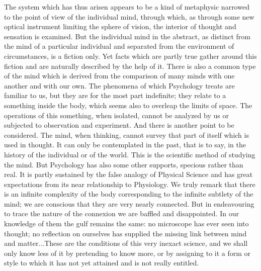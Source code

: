 The system which has thus arisen appears to be a kind of metaphysic
narrowed to the point of view of the individual mind, through which, as
through some new optical instrument limiting the sphere of vision, the
interior of thought and sensation is examined. But the individual mind
in the abstract, as distinct from the mind of a particular individual
and separated from the environment of circumstances, is a fiction only.
Yet facts which are partly true gather around this fiction and are
naturally described by the help of it. There is also a common type of
the mind which is derived from the comparison of many minds with one
another and with our own. The phenomena of which Psychology treats are
familiar to us, but they are for the most part indefinite; they relate
to a something inside the body, which seems also to overleap the limits
of space. The operations of this something, when isolated, cannot be
analyzed by us or subjected to observation and experiment. And there is
another point to be considered. The mind, when thinking, cannot
survey that part of itself which is used in thought. It can only
be contemplated in the past, that is to say, in the history of the
individual or of the world. This is the scientific method of studying
the mind. But Psychology has also some other supports, specious rather
than real. It is partly sustained by the false analogy of Physical
Science and has great expectations from its near relationship to
Physiology. We truly remark that there is an infinite complexity of
the body corresponding to the infinite subtlety of the mind; we are
conscious that they are very nearly connected. But in endeavouring to
trace the nature of the connexion we are baffled and disappointed. In
our knowledge of them the gulf remains the same: no microscope has ever
seen into thought; no reflection on ourselves has supplied the missing
link between mind and matter...These are the conditions of this very
inexact science, and we shall only know less of it by pretending to
know more, or by assigning to it a form or style to which it has not yet
attained and is not really entitled.

